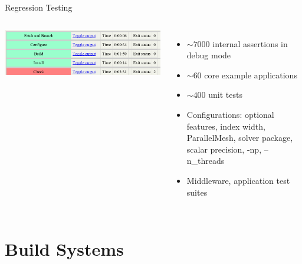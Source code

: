 \documentclass[mathserif]{beamer}
\begin{document}
\begin{frame}[t]{Regression Testing}
\begin{columns}
    \includegraphics[width=\textwidth]{civet}
    \begin{itemize}
    \item $\sim 7000$ internal assertions in debug mode
    \item $\sim 60$ core example applications 
    \item $\sim 400$ unit tests
    \item Configurations: optional features, index width, ParallelMesh,
                          solver package, scalar precision, -np, --n\_threads
    \item Middleware, application test suites
    \end{itemize}
  \end{columns}
\end{frame}


\section{Build Systems}
\end{document}
